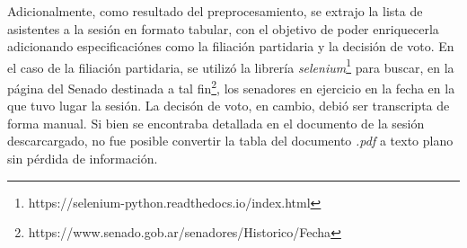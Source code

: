 \par
Adicionalmente, como resultado del preprocesamiento, se extrajo la lista de
asistentes a la sesión en formato tabular, con el objetivo de poder
enriquecerla adicionando especificaciónes como la filiación partidaria y la
decisión de voto. En el caso de la filiación partidaria, se utilizó la
librería \textit{selenium}\footnote{https://selenium-python.readthedocs.io/index.html}
para buscar, en la página del Senado destinada a tal fin\footnote{https://www.senado.gob.ar/senadores/Historico/Fecha},
los senadores en ejercicio en la fecha en la que tuvo lugar la sesión.
La decisón de voto, en cambio, debió ser transcripta de forma manual. Si bien
se encontraba detallada en el documento de la sesión descarcargado, no fue posible convertir
la tabla del documento \textit{.pdf} a texto plano sin pérdida de información.
